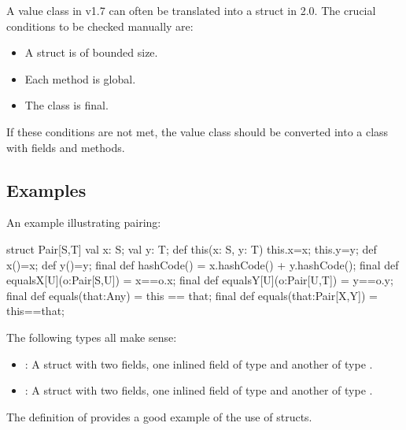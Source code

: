 A value class in \Xten{} v1.7 can often be translated into a struct in \Xten{} 2.0. The crucial conditions to be checked manually are: \begin{itemize}
\item  A struct is of bounded size. 
\item  Each method is global. 
\item  The class is final.
\end{itemize}
 

If these conditions are not met, the value class should be converted
into a class with  fields and methods.

\subsection{Examples}

An example illustrating pairing:
\begin{xten}
struct Pair[S,T]  {
  val x: S;
  val y: T;
  def this(x: S, y: T) {
    this.x=x;
    this.y=y;
  }
  def x()=x;
  def y()=y;  
  final def hashCode() = x.hashCode() + y.hashCode();
  final def equalsX[U](o:Pair[S,U]) = x==o.x;
  final def equalsY[U](o:Pair[U,T]) = y==o.y;
  final def equals(that:Any) = this == that;
  final def equals(that:Pair[X,Y]) = this==that;
}
\end{xten}

The following types all make sense: 
\begin{itemize}
\item {}: A struct with two fields, one inlined field of type  and another of type . 
\item {}: A struct with two fields, one inlined field of type  and another of type . 
\end{itemize}

The definition of  provides a good example of the use of structs.
